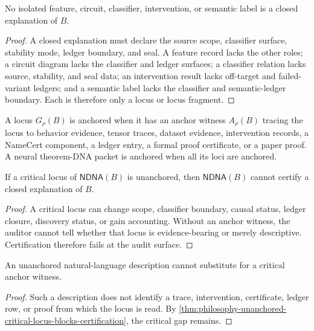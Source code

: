 \begin{theorem}
\label{thm:philosophy-single-locus-not-closed-neural-explanation}
No isolated feature, circuit, classifier, intervention, or semantic label
is a closed explanation of $B$.
\end{theorem}
\begin{proof}
A closed explanation must declare the source scope, classifier surface,
stability mode, ledger boundary, and seal. A feature record lacks the
other roles; a circuit diagram lacks the classifier and ledger surfaces;
a classifier relation lacks source, stability, and seal data; an
intervention result lacks off-target and failed-variant ledgers; and a
semantic label lacks the classifier and semantic-ledger boundary. Each is
therefore only a locus or locus fragment.
\end{proof}

\begin{definition}
\label{def:philosophy-anchored-ndna-locus}
A locus $G_{\rho}(B)$ is anchored when it has an anchor witness
$A_{\rho}(B)$ tracing the locus to behavior evidence, tensor traces,
dataset evidence, intervention records, a NameCert component, a ledger
entry, a formal proof certificate, or a paper proof. A neural
theorem-DNA packet is anchored when all its loci are anchored.
\end{definition}

\begin{theorem}
\label{thm:philosophy-unanchored-critical-locus-blocks-certification}
If a critical locus of $\mathsf{NDNA}(B)$ is unanchored, then
$\mathsf{NDNA}(B)$ cannot certify a closed explanation of $B$.
\end{theorem}
\begin{proof}
A critical locus can change scope, classifier boundary, causal status,
ledger closure, discovery status, or gain accounting. Without an anchor
witness, the auditor cannot tell whether that locus is evidence-bearing
or merely descriptive. Certification therefore fails at the audit
surface.
\end{proof}

\begin{corollary}
\label{cor:philosophy-natural-language-cannot-fill-anchor-gap}
An unanchored natural-language description cannot substitute for a
critical anchor witness.
\end{corollary}
\begin{proof}
Such a description does not identify a trace, intervention, certificate,
ledger row, or proof from which the locus is read. By
\autoref{thm:philosophy-unanchored-critical-locus-blocks-certification},
the critical gap remains.
\end{proof}

